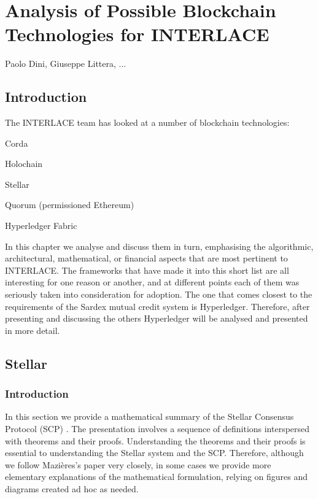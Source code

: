\chapter{Analysis of Possible Blockchain Technologies for INTERLACE}
\label{ch:dlt}

\vspace{-1cm}
\begin{center}
Paolo Dini, Giuseppe Littera, ...
\end{center}

\section{Introduction}
The INTERLACE team has looked at a number of blockchain technologies:
\begin{packed_item1}
\item Corda
\item Holochain
\item Stellar
\item Quorum (permissioned Ethereum)
\item Hyperledger Fabric
\end{packed_item1}
In this chapter we analyse and discuss them in turn, emphasising the algorithmic, architectural,  mathematical, or financial aspects that are most pertinent to INTERLACE. The frameworks that have made it into this short list are all interesting for one reason or another, and at different points each of them was seriously taken into consideration for adoption. The one that comes closest to the requirements of the Sardex mutual credit system is Hyperledger. Therefore, after presenting and discussing the others Hyperledger will be analysed and presented in more detail.

\section{Stellar}
\subsection{Introduction}
In this section we provide a mathematical summary of the Stellar Consensus Protocol (SCP) \cite{Mazieres2016}. The presentation involves a sequence of definitions interspersed with theorems and their proofs. Understanding the theorems and their proofs is essential to understanding the Stellar system and the SCP. Therefore, although we follow Mazi\`eres's paper \cite{Mazieres2016} very closely, in some cases we provide more elementary explanations of the mathematical formulation, relying on figures and diagrams created ad hoc as needed.

